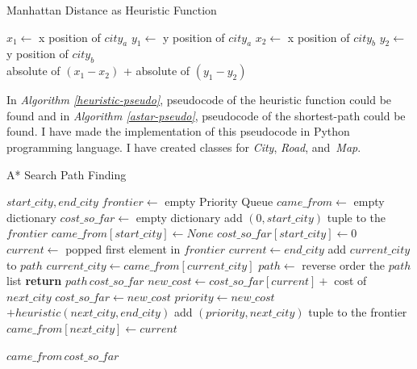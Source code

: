 \documentclass{IEEEtran}
\begin{document}
\begin{algorithm}
	\caption{Manhattan Distance as Heuristic Function\\}\label{heuristic-pseudo}
	\begin{algorithmic}[1]
		\State $x_1 \leftarrow$ x position of $city_a$
		\State $y_1 \leftarrow$ y position of $city_a$
		\State $x_2 \leftarrow$ x position of $city_b$
		\State $y_2 \leftarrow$ y position of $city_b$\\
		\Return absolute of $(x_1 - x_2)$ + absolute of $(y_1 - y_2)$
		\EndFunction\\
	\end{algorithmic}
\end{algorithm}

In \textit{Algorithm \ref{heuristic-pseudo}},  pseudocode of the heuristic function could be found and in \textit{Algorithm \ref{astar-pseudo}},  pseudocode of the shortest-path could be found. I have made the implementation of this pseudocode in Python programming language. I have created classes for \textit{City}, \textit{Road}, and \textit{Map}.

\begin{algorithm}
	\caption{A* Search Path Finding}\label{astar-pseudo}
	\begin{algorithmic}[1]
	 {$start\_city, end\_city$}
		\State$frontier \leftarrow$ empty Priority Queue
		\State$came\_from \leftarrow$ empty dictionary
		\State$cost\_so\_far \leftarrow$ empty dictionary
		\State add $(0, start\_city)$ tuple to the $frontier$
		\State$came\_from[start\_city] \leftarrow None $
		\State$cost\_so\_far[start\_city] \leftarrow 0$	
			\State$current \leftarrow$ popped first element in $frontier$
				\State$current \leftarrow end\_city$
					\State add $current\_city$ to $path$
					\State$current\_city \leftarrow came\_from[current\_city]$
				\EndWhile
				\State $path \leftarrow$ reverse order the $path$ list
				\State \textbf{return} $path\, cost\_so\_far$
			\EndIf
			\State$new\_cost \leftarrow cost\_so\_far[current] +$ cost of $next\_city$
					\State $cost\_so\_far \leftarrow new\_cost$
					\State $priority \leftarrow new\_cost$ \\$ + heuristic(next\_city, end\_city)$
					\State add $(priority, next\_city)$ tuple to the frontier
					\State$came\_from[next\_city] \leftarrow current$
				\EndIf
			\EndFor\\
		\EndWhile
		
		\Return $came\_from\, cost\_so\_far$
	\EndFunction
	\end{algorithmic}
\end{algorithm}
\end{document}
